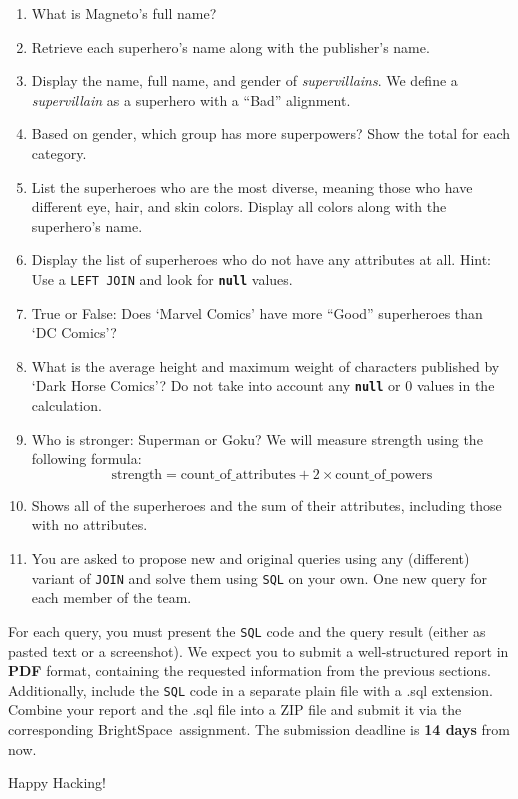 \documentclass{article}
\begin{document}
\begin{enumerate}
  \item What is Magneto's full name?
  \item Retrieve each superhero’s name along with the publisher’s name.
  \item Display the name, full name, and gender of \textit{supervillains}. We define a \textit{supervillain} as a superhero with a ``Bad'' alignment.
  \item Based on gender, which group has more superpowers? Show the total for each category.
  \item List the superheroes who are the most diverse, meaning those who have different eye, hair, and skin colors. Display all colors along with the superhero's name.
  \item Display the list of superheroes who do not have any attributes at all. Hint: Use a \texttt{LEFT JOIN} and look for \texttt{\textbf{null}} values.
  \item True or False: Does `Marvel Comics' have more ``Good'' superheroes than `DC Comics'?
  \item What is the average height and maximum weight of characters published by `Dark Horse Comics'? Do not take into account any \texttt{\textbf{null}} or $0$ values in the calculation.
  \item Who is stronger: Superman or Goku? We will measure strength using the following formula:
  $$
    \text{strength} = \text{count\_of\_attributes} + 2 \times \text{count\_of\_powers}
  $$
  \item Shows all of the superheroes and the sum of their attributes, including those with no attributes.
  \item You are asked to propose new and original queries using any (different) variant of \texttt{JOIN} and solve them using \texttt{SQL} on your own.  One new query for each member of the team.
\end{enumerate}

For each query, you must present the \texttt{SQL} code and the query result (either as pasted text or a screenshot). We expect you to submit a well-structured report in \textbf{PDF} format, containing the requested information from the previous sections. Additionally, include the \texttt{SQL} code in a separate plain file with a .sql extension. Combine your report and the .sql file into a ZIP file and submit it via the corresponding BrightSpace\texttrademark ~assignment. The submission deadline is \textbf{14 days} from now.

\vspace{5mm}
Happy Hacking! 
\end{document}

